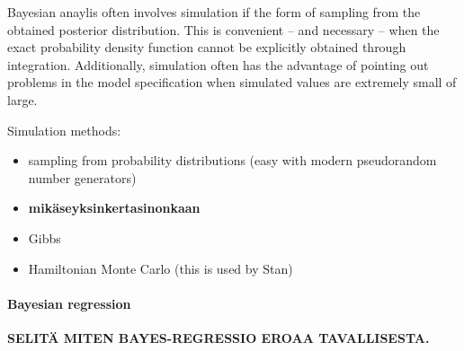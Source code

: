 Bayesian anaylis often involves simulation if the form of sampling from the
obtained posterior distribution. This is convenient -- and necessary -- when
the exact probability density function cannot be explicitly obtained through
integration. Additionally, simulation often has the advantage of pointing out
problems in the model specification when simulated values are extremely small
of large.

Simulation methods:
\begin{itemize}
  \item
  sampling from probability distributions (easy with modern pseudorandom
  number generators)
  \item
  \textbf{mikäseyksinkertasinonkaan}
  \item
  Gibbs
  \item
  Hamiltonian Monte Carlo (this is used by Stan)
\end{itemize}


\paragraph{Bayesian regression}\label{bayesian-regression}

\textbf{SELITÄ MITEN BAYES-REGRESSIO EROAA TAVALLISESTA.}
